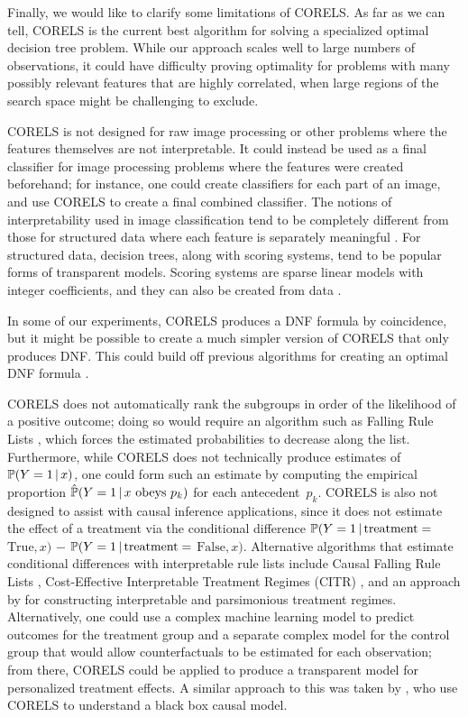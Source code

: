 \begin{arxiv}

Finally, we would like to clarify some limitations of CORELS.
%
As far as we can tell, CORELS is the current best algorithm for solving a
specialized optimal decision tree problem.
%
While our approach scales well to large numbers of observations,
it could have difficulty proving optimality
for problems with many possibly relevant features that are highly correlated,
when large regions of the search space might be challenging to exclude.

CORELS is not designed for raw image processing or other problems where the
features themselves are not interpretable.
%
It could instead be used as a final classifier for image processing problems
where the features were created beforehand; for instance, one could create classifiers
for each part of an image, and use CORELS to create a final combined classifier. The notions of interpretability used in image classification tend to be completely different from those for structured data where each feature is separately meaningful \citep[e.g., see][]{LiEtAl18}. For structured data, decision trees, along with scoring systems, tend to be popular forms of transparent models. Scoring systems are sparse linear models with integer coefficients, and they can also be created from data \citep{UstunRu2017KDD,UstunRu2016SLIM}.

In some of our experiments, CORELS produces a DNF formula by coincidence, but it might be possible to create a much simpler version of CORELS that only produces DNF. This could build off previous algorithms for creating an optimal DNF formula \citep{Rijnbeek10,WangEtAl16,WangEtAl2017}.

CORELS does not automatically rank the subgroups in order of the likelihood of a
positive outcome; doing so would require an algorithm such as Falling Rule Lists \citep{WangRu15,ChenRu18}, which forces the estimated probabilities to decrease along the list.
%
Furthermore, while CORELS does not technically produce estimates of ${\mathbb{P}(Y=1 \,|\, x)}$,
one could form such an estimate by computing the empirical
proportion ${\hat{\mathbb{P}}(Y=1 \,|\, x \textrm{ obeys } p_k)}$ for each antecedent~$p_k$.
%
CORELS is also not designed to assist with causal inference applications, since
it does not estimate the effect of a treatment via the conditional difference
${\mathbb{P}(Y=1 \,|\, \textrm{treatment} =}$ ${\textrm{True}, x)}$ $-$
${\mathbb{P}(Y=1 \,|\, \textrm{treatment} =}$ ${\textrm{False}, x)}$.
%
Alternative algorithms that estimate conditional differences with interpretable
rule lists include Causal Falling Rule Lists \citep{WangRu15CFRL},
Cost-Effective Interpretable Treatment Regimes (CITR) \citep{LakkarajuRu17},
and an approach by \citet{ZhangEtAl15} for constructing
interpretable and parsimonious treatment regimes. Alternatively, one could use a complex machine learning model to predict outcomes for the treatment group and a separate complex model for the control group that would allow counterfactuals to be estimated for each observation; from there, CORELS could be applied to produce a transparent model for personalized treatment effects. A similar approach to this was taken by \citet{GohRu18causal}, who use CORELS to understand a black box causal model.
%


\end{arxiv}
